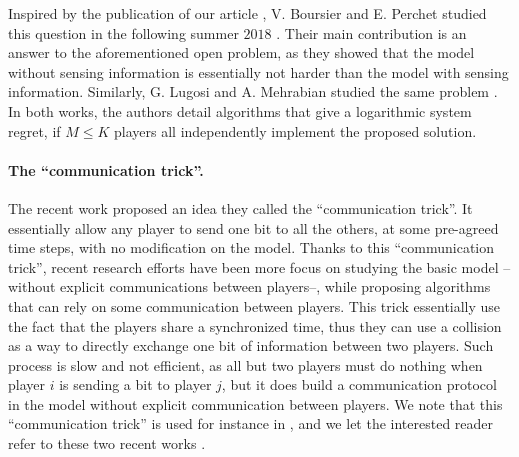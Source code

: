 Inspired by the publication of our article \cite{Besson2018ALT},
V. Boursier and E. Perchet studied this question in the following summer $2018$ \cite{BoursierPerchet18}.
Their main contribution is an answer to the aforementioned open problem,
as they showed that the model without sensing information is essentially not harder than the model with sensing information.
%
Similarly, G. Lugosi and A. Mehrabian studied the same problem \cite{LugosiMehrabian18}.
In both works, the authors detail algorithms that give a logarithmic system regret, if $M \leq K$ players all independently implement the proposed solution.


\paragraph{The ``communication trick''.}
%

The recent work \cite{BoursierPerchet18} proposed an idea they called the ``communication trick''.
It essentially allow any player to send one bit to all the others, at some pre-agreed time steps, with no modification on the model.
Thanks to this ``communication trick'', recent research efforts have been more focus on studying the basic model --without explicit communications between players--, while proposing algorithms that can rely on some communication between players.
This trick essentially use the fact that the players share a synchronized time, thus they can use a collision as a way to directly exchange one bit of information between two players.
Such process is slow and not efficient, as all but two players must do nothing when player $i$ is sending a bit to player $j$, but it does build a communication protocol in the model without explicit communication between players.
We note that this ``communication trick'' is used for instance in \cite{KaufmannAbbas19},
and we let the interested reader refer to these two recent works \cite{BoursierPerchet18,KaufmannAbbas19}.


